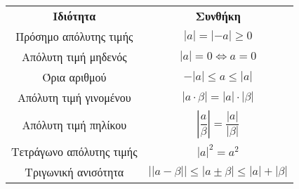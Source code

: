 \documentclass[twoside,10pt]{book}
\begin{document}
\begin{center}
\begin{longtable}{cc}
\hline \rule[-2ex]{0pt}{5.5ex}  \textbf{Ιδιότητα} & \textbf{Συνθήκη} \\
\hhline{==}\rule[-2ex]{0pt}{5.5ex}  Πρόσημο απόλυτης τιμής & $ |a|=|-a|\geq0 $ \\
\rule[-2ex]{0pt}{5.5ex}  Απόλυτη τιμή μηδενός & $ |a|=0\Leftrightarrow a=0 $\\
\rule[-2ex]{0pt}{5.5ex}  Όρια αριθμού & $ -|a|\leq a\leq|a| $ \\
\rule[-2ex]{0pt}{5.5ex}  Απόλυτη τιμή γινομένου & $ |a\cdot\beta|=|a|\cdot|\beta| $ \\
\rule[-2ex]{0pt}{5.5ex}  Απόλυτη τιμή πηλίκου & $ \left| \dfrac{a}{\beta}\right|=\dfrac{|a|}{|\beta|} $ \\
\rule[-2ex]{0pt}{5.5ex}  Τετράγωνο απόλυτης τιμής & $ |a|^2=a^2 $ \\
\rule[-2ex]{0pt}{5.5ex}  Τριγωνική ανισότητα & $ \left||a-\beta| \right|\leq|a\pm\beta|\leq|a|+|\beta|  $ \\
\hline
\end{longtable}
\end{center}
\end{document}
